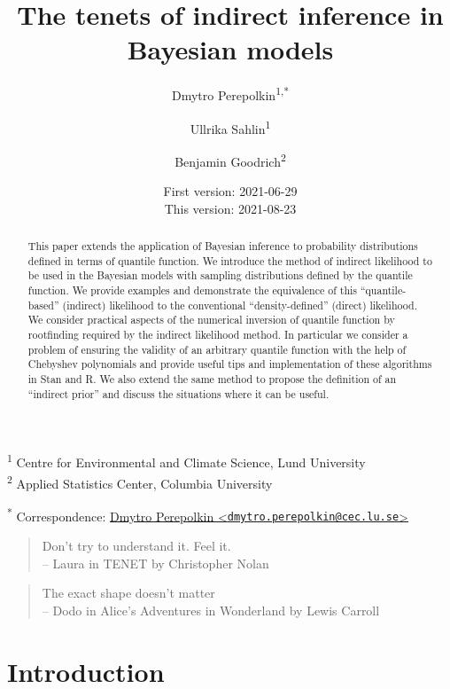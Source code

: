 \documentclass[
  12pt,
]{article}
\title{\vspace{1cm}The tenets of indirect inference in Bayesian models\vspace{0.5cm}}
\author{Dmytro Perepolkin\textsuperscript{1,*} \and Ullrika Sahlin\textsuperscript{1} \and Benjamin Goodrich\textsuperscript{2}}
\date{First version: 2021-06-29\\
This version: 2021-08-23}
\begin{document}
\maketitle
\begin{abstract}
\noindent{}
This paper extends the application of Bayesian inference to probability distributions defined in terms of quantile function. We introduce the method of indirect likelihood to be used in the Bayesian models with sampling distributions defined by the quantile function. We provide examples and demonstrate the equivalence of this ``quantile-based'' (indirect) likelihood to the conventional ``density-defined'' (direct) likelihood. We consider practical aspects of the numerical inversion of quantile function by rootfinding required by the indirect likelihood method. In particular we consider a problem of ensuring the validity of an arbitrary quantile function with the help of Chebyshev polynomials and provide useful tips and implementation of these algorithms in Stan and R. We also extend the same method to propose the definition of an ``indirect prior'' and discuss the situations where it can be useful. \vspace{.8cm}
\end{abstract}

\textsuperscript{1} Centre for Environmental and Climate Science, Lund University\\
\textsuperscript{2} Applied Statistics Center, Columbia University

\textsuperscript{*} Correspondence: \href{mailto:dmytro.perepolkin@cec.lu.se}{Dmytro Perepolkin \textless{}\href{mailto:dmytro.perepolkin@cec.lu.se}{\nolinkurl{dmytro.perepolkin@cec.lu.se}}\textgreater{}}

\setcounter{tocdepth}{4}
\tableofcontents
\renewcommand{\[}{\begin{equation}}
\renewcommand{\]}{\end{equation}}

\begin{quotation} 
Don’t try to understand it. Feel it. \\ 
-- Laura in TENET by Christopher Nolan 
\end{quotation}
\begin {quotation}
The exact shape doesn't matter \\ 
-- Dodo in Alice's Adventures in Wonderland by Lewis Carroll 
\end{quotation}

\hypertarget{introduction}{%
\section{Introduction}\label{introduction}}
\end{document}
